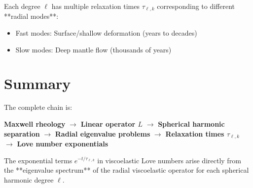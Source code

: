 \documentclass{article}
\begin{document}
Each degree $\ell$ has multiple relaxation times $\tau_{\ell,k}$ corresponding to different **radial modes**:
\begin{itemize}
\item Fast modes: Surface/shallow deformation (years to decades)
\item Slow modes: Deep mantle flow (thousands of years)
\end{itemize}

\section{Summary}

The complete chain is:
\begin{center}
\textbf{Maxwell rheology} $\rightarrow$ \textbf{Linear operator $L$} $\rightarrow$ \textbf{Spherical harmonic separation} $\rightarrow$ \textbf{Radial eigenvalue problems} $\rightarrow$ \textbf{Relaxation times $\tau_{\ell,k}$} $\rightarrow$ \textbf{Love number exponentials}
\end{center}

The exponential terms $e^{-t/\tau_{\ell,k}}$ in viscoelastic Love numbers arise directly from the **eigenvalue spectrum** of the radial viscoelastic operator for each spherical harmonic degree $\ell$.
\end{document}
